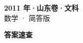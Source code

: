 \documentclass[zihao=-4, a4paper]{ctexart}
\begin{document}
\begin{center}
  {\Large\bfseries 2011 年·山东卷·文科}\\[4pt]
  {\large 数学 · 简答版}
\end{center}
\medskip
{}

\clearpage
{}
\begin{center}{\Large\bfseries 答案速查}\end{center}
\medskip

\end{document}
